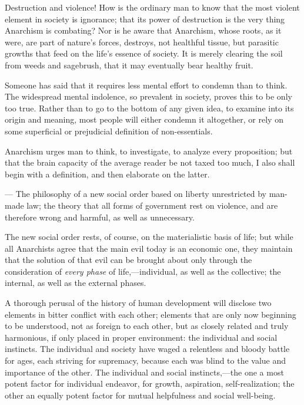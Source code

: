 Destruction and violence! How is the ordinary man to know that the
most violent element in society  is ignorance; that its power
of destruction is the very thing Anarchism is combating? Nor is he
aware that Anarchism, whose roots, as it were, are part of nature's
forces, destroys, not healthful tissue, but parasitic growths that
feed on the life's essence of society. It is merely clearing the soil
from weeds and sagebrush, that it may eventually bear healthy fruit.

Someone has said that it requires less mental effort to condemn than
to think. The widespread mental indolence, so prevalent in society,
proves this to be only too true. Rather than to go to the bottom of
any given idea, to examine into its origin and meaning, most people
will either condemn it altogether, or rely on some superficial or
prejudicial definition of non-essentials.

Anarchism urges man to think, to investigate, to analyze every
proposition; but that the brain capacity of the average reader be not
taxed too much, I also shall begin with a definition, and then
elaborate on the latter.

\begin{description}[format=\scshape\addcolon]

\item[Anarchism]--- The philosophy of a new social order based on
liberty unrestricted by man-made law; the theory that all forms of
government rest on violence, and are therefore wrong and harmful, as
well as unnecessary.

\end{description}

The new social order rests, of course, on the materialistic basis of
life; but while all Anarchists agree that the main evil today is an
economic one, they maintain that the solution of that evil can be
brought about only through the consideration of \textit{every phase}
of life,---in\-di\-vid\-u\-al, as well as the collective; the
internal, as well as the external phases.

A thorough perusal of the history of human development will
disclose two elements in bitter conflict with each other; elements
that are only now beginning to be understood, not as foreign to each
other, but as closely related and truly harmonious, if only placed in
proper environment: the individual and social instincts. The
individual and society have waged a relentless and bloody battle for
ages, each striving for supremacy, because each was blind to the value
and importance of the other. The individual and social
instincts,---the one a most potent factor for individual endeavor, for
growth, aspiration, self-realization; the other an equally potent
factor for mutual helpfulness and social well-being.

